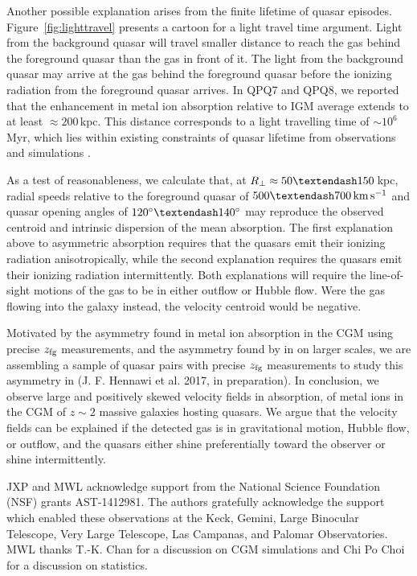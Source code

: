 \documentclass[iop]{emulateapj}
\begin{document}
Another possible explanation arises from the finite lifetime of quasar episodes. 
Figure~\ref{fig:lighttravel} presents a cartoon for a light travel time argument. Light from the 
background quasar will travel smaller distance to reach the gas behind the foreground quasar 
than the gas in front of it. The light from the background quasar may arrive at the gas behind 
the foreground quasar before the ionizing radiation from the foreground quasar arrives. In 
QPQ7 and QPQ8, we reported that the enhancement in metal ion absorption relative to IGM average 
extends to at least $\approx200$\,kpc. This distance corresponds to a light travelling time of 
$\sim10^6$\,Myr, which lies within existing constraints of quasar lifetime from observations 
\citep[e.g.][]{Martini04} and simulations \citep[e.g.][]{Hopkins+05}. 

As a test of reasonableness, we calculate that, at $R_\perp\approx50\textendash150$\,kpc, radial 
speeds relative to the foreground quasar of $500\textendash700\,{\rm km\,s^{-1}}$ and quasar 
opening angles of $120^\circ\textendash140^\circ$ may reproduce the observed centroid and 
intrinsic dispersion of the  mean absorption. The first explanation above to asymmetric 
absorption requires that the quasars emit their ionizing radiation anisotropically, while the 
second explanation requires the quasars emit their ionizing radiation intermittently. Both 
explanations will require the line-of-sight motions of the gas to be in either outflow or Hubble 
flow. Were the gas flowing into the galaxy instead, the velocity centroid would be negative. 

Motivated by the asymmetry found in metal ion absorption in the CGM using precise $z_{\rm fg}$ 
measurements, and the asymmetry found by \cite{KirkmanTytler08} in  on larger 
scales, we are assembling a sample of quasar pairs with precise $z_{\rm fg}$ measurements to study 
this asymmetry in  (J. F. Hennawi et al. 2017, in preparation). In conclusion, we 
observe large and positively skewed velocity fields in absorption, of metal ions 
in the CGM of $z\sim2$ massive galaxies hosting quasars. We argue that the velocity fields can be 
explained if the detected gas is in gravitational motion, Hubble flow, or outflow, and the quasars 
either shine preferentially toward the observer or shine intermittently. 

\acknowledgements

JXP and MWL acknowledge support from the National Science Foundation (NSF) grants AST-1412981. The 
authors gratefully acknowledge the support which enabled these observations at the Keck, Gemini, 
Large Binocular Telescope, Very Large Telescope, Las Campanas, and Palomar Observatories. MWL 
thanks T.-K. Chan for a discussion on CGM simulations and Chi Po Choi for a discussion on 
statistics. 



\end{document}
